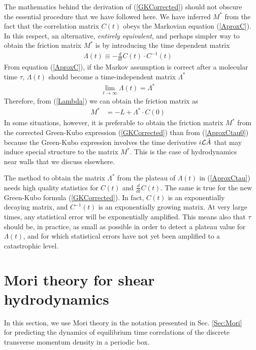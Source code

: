\documentclass[b5paper,openright,10pt]{book}
\newcommand{\esc}{\!\cdot\!}
\begin{document}
The mathematics  behind the  derivation of  (\ref{GKCorrected}) should
not obscure  the essential  procedure that we  have followed  here. We
have inferred $M^*$  from the fact that the  correlation matrix $C(t)$
obeys  the Markovian  equation  (\ref{AproxC}).  In  this respect,  an
alternative, \textit{entirely equivalent}, and  perhaps simpler way to
obtain the friction matrix $M^*$  is by introducing the time dependent
matrix
\begin{align}
\Lambda(t)\equiv-    \frac{d}{dt}C(t)\esc C^{-1}(t)
\label{AproxCtau}
\end{align}
From equation (\ref{AproxC}),  if the Markov assumption is  correct after a
molecular  time   $\tau$,  $\Lambda(t)$  should   become  a
time-independent matrix  $\Lambda^*$
\begin{align}
  \lim_{t\to \infty}\Lambda(t)=\Lambda^*
\label{toLambda*}
\end{align}
Therefore, from (\ref{Lambda}) we can obtain the friction matrix as
\begin{align}
M^*&=  -L+ \Lambda^*\esc C(0)
\label{AproxCtau0}
\end{align}
In some situations,  however, it is preferable to  obtain the friction
matrix    $M^*$    from    the   corrected    Green-Kubo    expression
(\ref{GKCorrected})   than   from   (\ref{AproxCtau0})   because   the
Green-Kubo expression involves the  time derivative $i{\cal L}\hat{A}$
that may  induce special structure to  the matrix $M^*$.  This  is the
case of hydrodynamics near walls that we discuss elsewhere.

The  method to  obtain  the  matrix $\Lambda^*$  from  the plateau  of
$\Lambda(t)$ in  (\ref{AproxCtau}) needs  high quality  statistics for
$C(t)$  and  $\frac{d}{dt}C(t)$.   The  same   is  true  for  the  new
Green-Kubo  formula (\ref{GKCorrected}).   In  fact,  ${C}(t)$ is  an
exponentially  decaying matrix,  and $C^{-1}(t)$  is an  exponentially
growing matrix.   At very large  times, any statistical error  will be
exponentially amplified.  This  means also that $\tau$  should be, in
practice, as small as possible in  order to detect a plateau value for
$\Lambda(t)$,  and for  which  statistical errors  have  not yet  been
amplified to a  catastrophic level.  


\section{Mori theory for shear hydrodynamics}
\label{Sec:MoriPBC}
In this section, we use Mori theory in the notation presented in Sec. \ref{Sec:Mori} for predicting the dynamics of equilibrium time correlations of the discrete transverse momentum density in a periodic box. 
\end{document}
